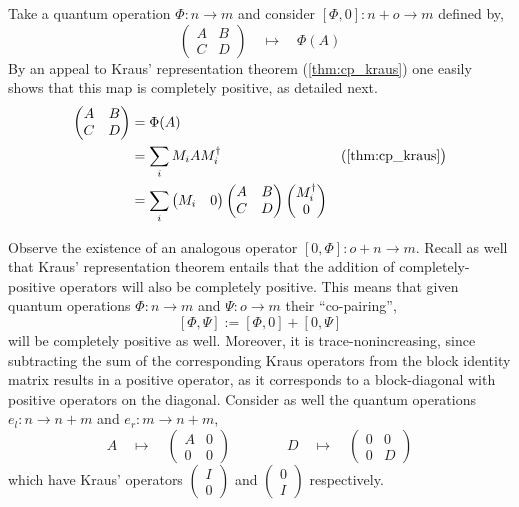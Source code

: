 Take a quantum operation $\Phi : n \to m$ and consider $[\Phi
,0] : n+o \to m$ defined by,
\[
 \begin{pmatrix}
         A & B 
         \\
         C & D
 \end{pmatrix} 
 \quad
 \longmapsto 
 \quad
 \Phi(A)
\]
By an appeal to Kraus' representation theorem (\autoref{thm:cp_kraus}) one easily shows that this map is completely positive, as detailed next.  
\begin{align*}
        [\Phi, 0]
        \begin{pmatrix}
         A & B 
         \\
         C & D
        \end{pmatrix} 
        & =
        \Phi(A)
        \\
        &
        = 
        \sum_i M_i A M^\dagger_i
        & (\text{\autoref{thm:cp_kraus}} \big )
        \\
        &
        = \sum_i 
        \begin{pmatrix}
        M_i & 0 
        \end{pmatrix} 
        \begin{pmatrix}
        A & B
         \\
        C & D
        \end{pmatrix} 
        \begin{pmatrix}
        M_i^\dagger \\
        0 
        \end{pmatrix} 
\end{align*}

Observe the existence of an analogous operator $[0,\Phi] : o + n \to m$.
Recall as well that Kraus' representation theorem entails that the addition of
completely-positive operators will also be completely positive.
This means that
given quantum operations $\Phi : n \to m$ and $\Psi : o \to m$ their
``co-pairing'',
\[
        [\Phi, \Psi] := [\Phi, 0] + [0, \Psi]
\]
will be completely positive as well. Moreover, it is trace-nonincreasing, since subtracting the sum of the corresponding Kraus operators from the block identity matrix results in a positive operator, as it corresponds to a block-diagonal with positive operators on the diagonal. Consider as well the quantum operations $e_l : n \to n +m$ and
$e_r : m \to n + m$,
\[
        A \quad \longmapsto \quad
        \begin{pmatrix}
                A & 0 
                \\
                0 & 0
        \end{pmatrix}
        \qquad
        \qquad
        D \quad \longmapsto \quad
        \begin{pmatrix}
                0 & 0 
                \\
                0 & D
        \end{pmatrix}
\]
which have Kraus' operators $\begin{pmatrix} I \\ 0 \end{pmatrix}$ and
$\begin{pmatrix} 0 \\ I \end{pmatrix}$ respectively.  


